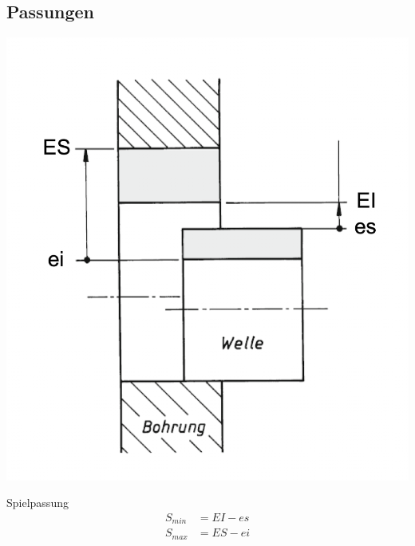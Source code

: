 \subsection{Passungen}
    \begin{minipage}{0.99\linewidth}
        \begin{minipage}{0.49\linewidth}
            \begin{center}
                \includegraphics[width = 0.6\linewidth]{src/images/MAEIP_Spielpassung.png}
            \end{center}
        \end{minipage}
        \begin{minipage}{0.49\linewidth}
            Spielpassung
            \begin{align*}
                S_{min} &= EI - es\\
                S_{max} &= ES - ei
            \end{align*}
        \end{minipage}
    \end{minipage}

